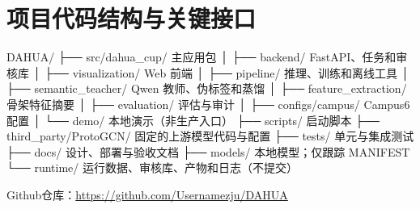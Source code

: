 \chapter{项目代码结构与关键接口}

\begin{NotionCode}
DAHUA/
├── src/dahua_cup/              主应用包
│   ├── backend/                FastAPI、任务和审核库
│   ├── visualization/          Web 前端
│   ├── pipeline/               推理、训练和离线工具
│   ├── semantic_teacher/       Qwen 教师、伪标签和蒸馏
│   ├── feature_extraction/     骨架特征摘要
│   ├── evaluation/             评估与审计
│   ├── configs/campus/         Campus6 配置
│   └── demo/                   本地演示（非生产入口）
├── scripts/                    启动脚本
├── third_party/ProtoGCN/       固定的上游模型代码与配置
├── tests/                      单元与集成测试
├── docs/                       设计、部署与验收文档
├── models/                     本地模型；仅跟踪 MANIFEST
└── runtime/                    运行数据、审核库、产物和日志（不提交）
\end{NotionCode}

\noindent Github仓库：\url{https://github.com/Usernamezju/DAHUA}
